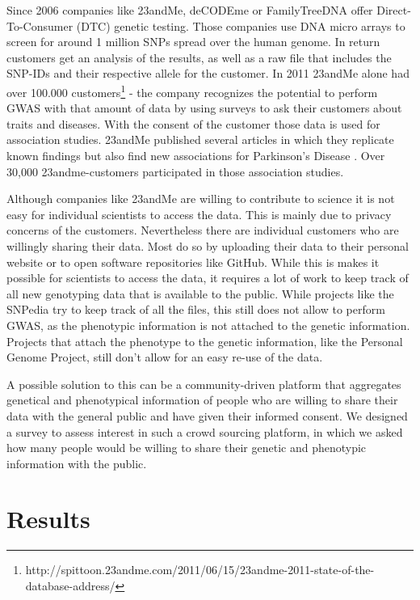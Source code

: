 \documentclass[10pt]{article}
\begin{document}
Since 2006 companies like 23andMe, deCODEme or FamilyTreeDNA offer Direct-To-Consumer (DTC) genetic testing. Those companies use DNA micro arrays to screen for around 1 million SNPs spread over the human genome. In return customers get an analysis of the results, as well as a raw file that includes the SNP-IDs and their respective allele for the customer. In 2011 23andMe alone had over 100.000 customers\footnote{http://spittoon.23andme.com/2011/06/15/23andme-2011-state-of-the-database-address/} - the company recognizes the potential to perform GWAS with that amount of data by using surveys to ask their customers about traits and diseases. With the consent of the customer those data is used for association studies. 23andMe published several articles in which they replicate known findings but also find new associations for Parkinson's Disease \cite{Eriksson2010, Do2011}. Over 30,000 23andme-customers participated in those association studies.  

Although companies like 23andMe are willing to contribute to science it is not easy for individual scientists to access the data. This is mainly due to privacy concerns of the customers. Nevertheless there are individual customers who are willingly sharing their data. Most do so by uploading their data to their personal website or to open software repositories like GitHub. While this is makes it possible for scientists to access the data, it requires a lot of work to keep track of all new genotyping data that is available to the public. While projects like the SNPedia try to keep track of all the files, this still does not allow to perform GWAS, as the phenotypic information is not attached to the genetic information. Projects that attach the phenotype to the genetic information, like the Personal Genome Project, still don't allow for an easy re-use of the data. %

A possible solution to this can be a community-driven platform that aggregates genetical and phenotypical information of people who are willing to share their data with the general public and have given their informed consent. We designed a survey to assess interest in such a crowd sourcing platform, in which we asked how many people would be willing to share their genetic and phenotypic information with the public. 

\section*{Results}
\end{document}
